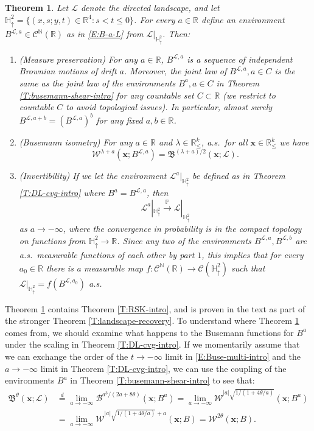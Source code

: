 \documentclass[11pt]{article}
\newcommand{\N}{\mathbb{N}}
\newcommand{\R}{\mathbb{R}}
\newcommand{\la}{\lambda}
\newcommand{\cB}{\mathcal{B}}
\newcommand{\cC}{\mathcal{C}}
\newcommand{\cL}{\mathcal{L}}
\newcommand{\cW}{\mathcal{W}}
\newcommand{\fB}{\mathfrak{B}}
\newcommand{\eqd}{\stackrel{d}{=}}
\newcommand{\cvgp}{\stackrel{\mathbb{P}}{\to}}
\newcommand{\bx}{\mathbf{x}}
\newtheorem{theorem}{Theorem}[section]
\theoremstyle{definition} %
\theoremstyle{remark} %
\begin{document}
\begin{theorem}
	\label{T:landscape-recovery-intro}
Let $\cL$ denote the directed landscape, and let $\mathbb H^2_\uparrow = \{(x, s; y, t) \in \R^4 : s < t \le 0\}$. For every $a \in \R$ define an environment $B^{\cL,a} \in \cC^\N(\R)$ as in \eqref{E:B-a-L} from $\cL|_{\mathbb H^2_\uparrow}$.
Then:
\begin{enumerate}
	\item (Measure preservation) For any $a \in \R$, $B^{\cL,a}$ is a sequence of independent Brownian motions of drift $a$. Moreover, the joint law of $B^{\cL,a}, a \in C$ is the same as the joint law of the environments $B^a, a \in C$ in Theorem \ref{T:busemann-shear-intro} for any countable set $C \subset \R$ (we restrict to countable $C$ to avoid topological issues). In particular, almost surely $B^{\cL,a + b} = (B^{\cL,a})^b$ for any fixed $a, b\in \R$. 
	\item (Busemann isometry) For any $a \in \R$ and $\la \in \R^k_\le$, a.s.\ for all $\bx \in \R^k_\le$ we have
	$$
	\cW^{\la + a}(\bx; B^{\cL,a}) = \fB^{(\la + a)/2}(\bx; \cL).
	$$
	\item (Invertibility) If we let the environment $\cL^a|_{\mathbb H^2_\uparrow}$ be defined as in Theorem \ref{T:DL-cvg-intro} where $B^a = B^{\cL,a}$, then
	$$
	\cL^a|_{\mathbb H^2_\uparrow} \cvgp \cL|_{\mathbb H^2_\uparrow}
	$$
	as $a \to -\infty$, where the convergence in probability is in the compact topology on functions from $\mathbb H^2_\uparrow \to \R$. Since any two of the environments $B^{\cL, a}, B^{\cL, b}$ are a.s.\ measurable functions of each other by part $1$, this implies that for every $a_0 \in \R$ there is a measurable map $f:\cC^\N(\R) \to \cC(\mathbb H^2_\uparrow)$ such that $\cL|_{\mathbb H^2_\uparrow} = f(B^{\cL,a_0})$ a.s.
\end{enumerate}
\end{theorem}
Theorem \ref{T:landscape-recovery-intro} contains Theorem \ref{T:RSK-intro}, and is proven in the text as part of the stronger Theorem \ref{T:landscape-recovery}.
To understand where Theorem \ref{T:landscape-recovery-intro} comes from, we should examine what happens to the Busemann functions for $B^a$ under the scaling in Theorem \ref{T:DL-cvg-intro}. If we momentarily assume that we can exchange the order of the $t \to -\infty$ limit in \eqref{E:Buse-multi-intro} and the $a \to -\infty$ limit in Theorem \ref{T:DL-cvg-intro}, we can use the coupling of the environments $B^a$ in Theorem \ref{T:busemann-shear-intro} to see that:
\begin{equation}
	\label{E:land-cpu}
	\begin{split}
	\fB^\theta(\bx; \cL) &\eqd \lim_{a \to -\infty} \cB^{a^3/(2a + 8 \theta)}(\bx; B^a) = \lim_{a \to -\infty} \cW^{|a| \sqrt{1/(1 + 4\theta/a)}}(\bx; B^a) \\
	&= \lim_{a \to -\infty} \cW^{|a| \sqrt{1/(1 + 4\theta/a)} + a}(\bx; B) = \cW^{2 \theta}(\bx ; B).
	\end{split}
\end{equation}
\end{document}

